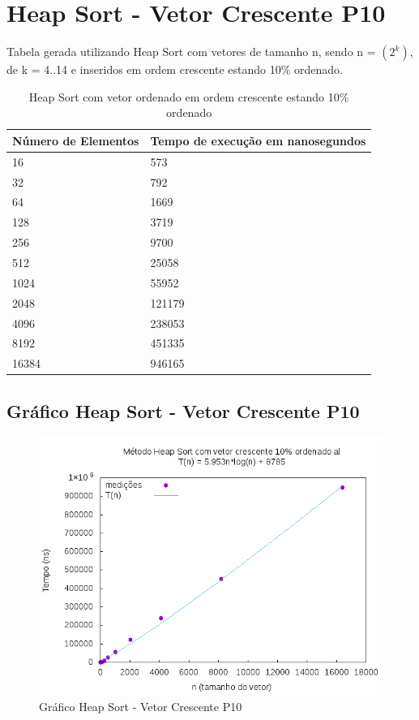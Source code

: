 \documentclass[12pt,a4paper,twoside]{report}
\begin{document}
\section{Heap Sort - Vetor Crescente P10}
Tabela gerada utilizando Heap Sort com vetores de tamanho n, sendo n = $(2^k)$, de k = 4..14 e inseridos em ordem crescente estando 10\% ordenado.
\begin{table}[H]
\centering
\caption{Heap Sort com vetor ordenado em ordem crescente estando 10\% ordenado}
\label{my-label}
\begin{tabular}{|l|l|}
\hline
\multicolumn{1}{|c|}{\textbf{Número de Elementos}} & \multicolumn{1}{c|}{\textbf{Tempo de execução em nanosegundos}} \\ \hline
16 & 573 \\ \hline
32 & 792 \\ \hline
64 & 1669 \\ \hline
128 & 3719 \\ \hline
256 & 9700 \\ \hline
512 & 25058 \\ \hline
1024 & 55952 \\ \hline
2048 & 121179 \\ \hline
4096 & 238053 \\ \hline
8192 & 451335 \\ \hline
16384 & 946165 \\ \hline
\end{tabular}
\end{table}

\subsection{Gráfico Heap Sort - Vetor Crescente P10}
\begin{figure}[H]
    \centering
    \includegraphics[width=0.7\linewidth]{graficos/HeapSort/vIntCrescenteP10/vIntCrescenteP10.png}
  \caption{Gráfico Heap Sort - Vetor Crescente P10}
\end{figure}
\end{document}
